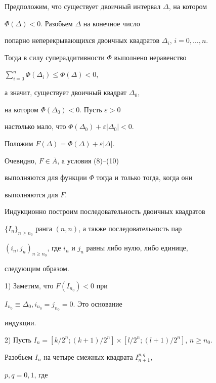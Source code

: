 \begin{pf}


Предположим, что существует двоичный интервал $\Delta $, на котором\linebreak


$\Phi (\Delta)<0$. Разобьем $\Delta $ на конечное число


попарно неперекрывающихся двоичных квадратов $\Delta _{i}$, $i=0,\dotsc,n$.


Тогда в силу супераддитивности $\Phi$ выполнено неравенство


$\sum\limits _{i=0}^{n}\Phi (\Delta _{i})\le \Phi (\Delta)<0$,


а значит, существует двоичный квадрат $\Delta _{0}$,


на котором $\Phi (\Delta _{0}) <0$. Пусть $\varepsilon >0$


настолько мало, что $\Phi (\Delta _{0}) +\varepsilon | \Delta _{0}| <0$.


Положим $F(\Delta)=\Phi (\Delta ) +\varepsilon | \Delta | $.


Очевидно, $F\in \overline{A}$, а условия (8)--(10)


выполняются для функции $\Phi $ тогда и только тогда, когда они


выполняются для $F$.





Индукционно построим последовательность двоичных квадратов


$\{I_{n}\}_{n\geq n_0}$ ранга $(n,n)$, а также последовательность пар 


$(i_{n},j_{n})_{n\geq n_0}$, где $i_n$ и $j_n$ равны либо нулю, либо единице, 


следующим образом.





1) Заметим, что $F(I_{n_{0}})<0$ при


$I_{n_{0}}\equiv \Delta _{0},i_{n_{0}}=j_{n_{0}}=0$. Это основание


индукции. 





2) Пусть $ I_{n}=[ k/2^{n};(k+1)/2^{n}] 


\times [ l/2^{n};(l+1)/2^{n}]$, $n\ge n_{0}$.


Разобьем $I_{n}$ на четыре смежных квадрата $I^{p,q}_{n+1}$, 


$p,q=0,1$, где 


$$



\end{pf}
